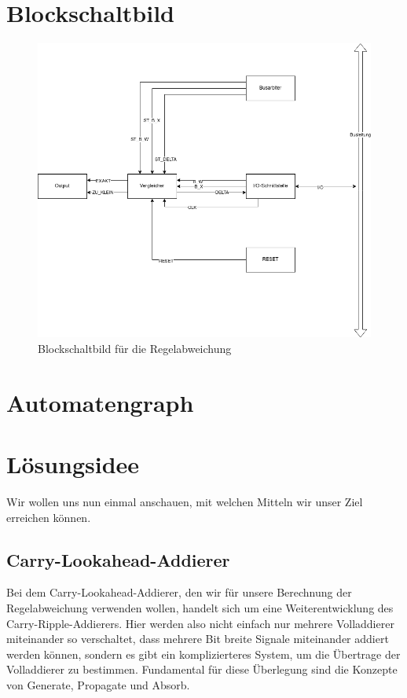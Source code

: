 \documentclass{report}
\begin{document}
\section{Blockschaltbild}
\label{sec:blockschaltbild-1}

\begin{figure}[h]
  \centering
  \includegraphics[width=\textwidth]{../assets/images/DIHA/delta.png}
  \caption{Blockschaltbild für die Regelabweichung}
  \label{fig:blockregel}
\end{figure}



\section{Automatengraph}
\label{sec:automatengraph}


\section{Lösungsidee}
\label{sec:losungsidee-1}

Wir wollen uns nun einmal anschauen, mit welchen Mitteln wir unser Ziel erreichen können.

\subsection{Carry-Lookahead-Addierer}
\label{sec:carry-look-addi}

Bei dem Carry-Lookahead-Addierer, den wir für unsere Berechnung der Regelabweichung verwenden wollen, handelt sich um eine Weiterentwicklung des Carry-Ripple-Addierers. Hier werden also nicht einfach nur mehrere Volladdierer miteinander so verschaltet, dass mehrere Bit breite Signale miteinander addiert werden können, sondern es gibt ein komplizierteres System, um die Übertrage der Volladdierer zu bestimmen. Fundamental für diese Überlegung sind die Konzepte von Generate, Propagate und Absorb.
\end{document}

